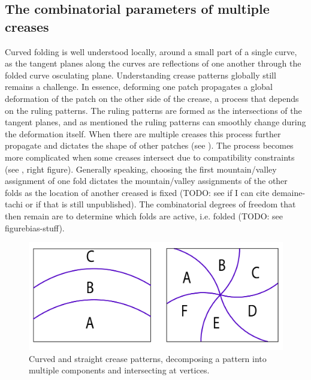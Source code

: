 \subsection{The combinatorial parameters of multiple creases}
Curved folding is well understood locally, around a small part of a single curve, as the tangent planes along the curves are reflections of one another through the folded curve osculating plane. Understanding crease patterns globally still remains a challenge. In essence, deforming one patch propagates a global deformation of the patch on the other side of the crease, a process that depends on the ruling patterns. The ruling patterns are formed as the intersections of the tangent planes, and as mentioned the ruling patterns can smoothly change during the deformation itself. When there are multiple creases this process further propagate and dictates the shape of other patches (see ). The process becomes more complicated when some creases intersect due to compatibility constraints (see , right figure). Generally speaking, choosing the first mountain/valley assignment of one fold dictates the mountain/valley assignments of the other folds as the location of another creased is fixed (TODO: see if I can cite demaine-tachi or if that is still unpublished). The combinatorial degrees of freedom that then remain are to determine which folds are active, i.e. folded (TODO: see figurebias-stuff).


\begin{figure} [h]
	\centering
	\includegraphics[width=0.7\linewidth]{figures/multiple_crease_patterns}
	\caption{Curved and straight crease patterns, decomposing a pattern into multiple components and intersecting at vertices.}
	\label{fig:multiple_crease_pattern}
\end{figure}
